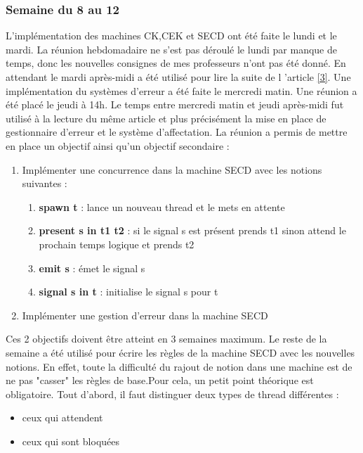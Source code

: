 \documentclass[10pt,a4paper]{article}
\begin{document}
			\newpage
		
		\subsubsection{Semaine du 8 au 12}
			L'implémentation des machines CK,CEK et SECD ont été faite le lundi et le mardi. La réunion hebdomadaire ne s'est pas déroulé le lundi par manque de temps, donc les nouvelles consignes de mes professeurs n'ont pas été donné. En attendant le mardi après-midi a été utilisé pour lire la suite de l 'article \hyperref[Calculi]{[3]}.
			\smallbreak
			Une implémentation du systèmes d'erreur a été faite le mercredi matin. 
			Une réunion a été placé le jeudi à 14h. Le temps entre mercredi matin et jeudi après-midi fut utilisé à la lecture du même article et plus précisément la mise en place de gestionnaire d'erreur et le système d'affectation.
			\smallbreak
			La réunion a permis de mettre en place un objectif ainsi qu'un objectif secondaire :
			\begin{enumerate}
				\item Implémenter une concurrence dans la machine SECD avec les notions suivantes :
					\begin{enumerate}
						\item \textbf{spawn t} : lance un nouveau thread et le mets en attente
						\item \textbf{present s in t1 t2} : si le signal s est présent prends t1 sinon attend le prochain temps logique et prends t2
						\item \textbf{emit s} : émet le signal s
						\item \textbf{signal s in t} : initialise le signal s pour t 
					\end{enumerate}
				\item Implémenter une gestion d'erreur dans la machine SECD 
			\end{enumerate}
			Ces 2 objectifs doivent être atteint en 3 semaines maximum.
			\medbreak
			Le reste de la semaine a été utilisé pour écrire les règles de la machine SECD avec les nouvelles notions. En effet, toute la difficulté du rajout de notion dans une machine est de ne pas "casser" les règles de base.Pour cela, un petit point théorique est obligatoire.
			\smallbreak
			Tout d'abord, il faut distinguer deux types de thread différentes :
			\begin{itemize}
				\item ceux qui attendent
				\item ceux qui sont bloquées
			\end{itemize}
			\bigbreak
			
\end{document}
